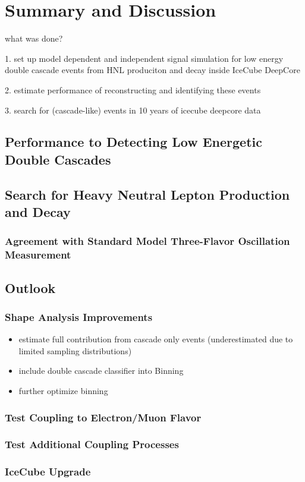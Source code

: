 \setchapterpreamble[u]{\margintoc}

\chapter{Summary and Discussion}

what was done?

1. set up model dependent and independent signal simulation for low energy double cascade events from HNL produciton and decay inside IceCube DeepCore

2. estimate performance of reconstructing and identifying these events

3. search for (cascade-like) events in 10 years of icecube deepcore data


\section{Performance to Detecting Low Energetic Double Cascades}


\section{Search for Heavy Neutral Lepton Production and Decay}

\subsection{Agreement with Standard Model Three-Flavor Oscillation Measurement}


\section{Outlook}

\subsection{Shape Analysis Improvements}

\begin{itemize}
    \item estimate full contribution from cascade only events (underestimated due to limited sampling distributions)
    \item include double cascade classifier into Binning
    \item further optimize binning
\end{itemize}

\subsection{Test Coupling to Electron/Muon Flavor}

\subsection{Test Additional Coupling Processes}

\subsection{IceCube Upgrade}
